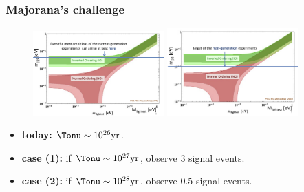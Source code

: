 \begin{frame}
\frametitle{Majorana's challenge}

\begin{figure}[tbh!]
  \begin{center}
      \includegraphics[width=0.45\textwidth]{moriond/current_experiments.png}
       \includegraphics[width=0.45\textwidth]{moriond/nextgen_experiments.png}
      
  \end{center}
\end{figure}
\begin{itemize}
\item {\bf today:} $\Tonu \sim 10^{26} {\rm yr}$.
\item {\bf case (1):} if $\Tonu \sim 10^{27} {\rm yr}$, observe 3 signal events.
\item {\bf case (2):} if $\Tonu \sim 10^{28} {\rm yr}$, observe 0.5 signal events.
\end{itemize}
\end{frame}

